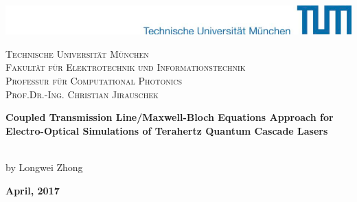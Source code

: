 %
%


\begin{titlepage}

\begin{center}
    \includegraphics[width=\textwidth]{Logos2.pdf}%
    
    \vspace{25mm}	
    
    {
        \scshape	
        Technische Universität München\\
        Fakultät für Elektrotechnik und Informationstechnik\\																										%
        Professur für Computational Photonics\\
        Prof.Dr.-Ing. Christian Jirauschek
    }
		
    \vspace{25mm}																								

    \begin{LARGE}
        \normalfont\rmfamily \textbf{Coupled Transmission Line/Maxwell-Bloch Equations Approach for Electro-Optical Simulations of Terahertz Quantum Cascade Lasers}\\[6cm]
    \end{LARGE}
   \\[0.5cm]
    
    by Longwei Zhong

    \textbf{April, 2017}\\[2cm]
																	
 																	
\end{center}

\end{titlepage}

\clearpage \thispagestyle{empty} \cleardoublepage 






